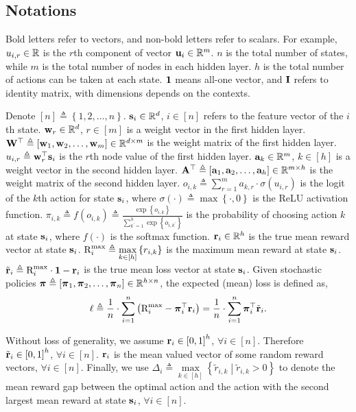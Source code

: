 \subsection{Notations}
\label{subsec:notations}

Bold letters refer to vectors, and non-bold letters refer to scalars. For example, $u_{i,r} \in {\mathbb{R}}$ is the $r$th component of vector ${\mathbf{u}}_i \in {\mathbb{R}}^m$. $n$ is the total number of states, while $m$ is the total number of nodes in each hidden layer. $h$ is the total number of actions can be taken at each state. ${\mathbf{1}}$ means all-one vector, and ${\mathbf{I}}$ refers to identity matrix, with dimensions depends on the contexts.

Denote $[n] \triangleq \left\{ 1,2, \dots, n \right\}$. ${\mathbf{s}}_i \in {\mathbb{R}}^d$, $i \in [n]$ refers to the feature vector of the $i$th state. ${\mathbf{w}}_r \in {\mathbb{R}}^d$, $r \in [m]$ is a weight vector in the first hidden layer. ${\mathbf{W}}^\top \triangleq \left[ {\mathbf{w}}_1, {\mathbf{w}}_2, \dots, {\mathbf{w}}_m \right] \in {\mathbb{R}}^{d \times m}$ is the weight matrix of the first hidden layer. $u_{i,r} \triangleq {\mathbf{w}}_r^\top {\mathbf{s}}_i$ is the $r$th node value of the first hidden layer. ${\mathbf{a}}_k \in {\mathbb{R}}^m$, $k \in [h]$ is a weight vector in the second hidden layer. ${\mathbf{A}}^\top \triangleq \left[ {\mathbf{a}}_1, {\mathbf{a}}_2, \dots, {\mathbf{a}}_h \right] \in {\mathbb{R}}^{m \times h}$ is the weight matrix of the second hidden layer. $o_{i,k} \triangleq \sum\limits_{r=1}^{m}{a_{k,r} \cdot \sigma\left( u_{i,r} \right)}$ is the logit of the $k$th action for state ${\mathbf{s}}_i$, where $\sigma(\cdot) \triangleq \max\left\{ \cdot, 0 \right\}$ is the ReLU activation function. $\pi_{i,k} \triangleq f\left( o_{i,k} \right) \triangleq \frac{\exp\left\{ o_{i,k} \right\}}{\sum\limits_{k^\prime = 1}^{h}{\exp\left\{ o_{i,k^\prime} \right\}}}$ is the probability of choosing action $k$ at state ${\mathbf{s}}_i$, where $f(\cdot)$ is the softmax function. ${\mathbf{r}}_i \in {\mathbb{R}}^h$ is the true mean reward vector at state ${\mathbf{s}}_i$. ${\text{R}}_i^{\max} \triangleq \max\limits_{k \in [h]}\left\{ r_{i,k} \right\}$ is the maximum mean reward at state ${\mathbf{s}}_i$. ${\tilde{\mathbf{r}}}_i \triangleq {\text{R}}_i^{\max} \cdot {\mathbf{1}} - {\mathbf{r}}_i$ is the true mean loss vector at state ${\mathbf{s}}_i$. Given stochastic policies ${\boldsymbol{\pi}} \triangleq \left[ {\boldsymbol{\pi}}_1, {\boldsymbol{\pi}}_2, \dots, {\boldsymbol{\pi}}_n \right] \in {\mathbb{R}}^{h \times n}$, the expected (mean) loss is defined as,
\begin{equation}
\label{eq:expected_loss}
\begin{split}
    \ell \triangleq \frac{1}{n} \cdot \sum\limits_{i=1}^{n}{ \left( {\text{R}}_i^{\max} - {\boldsymbol{\pi}}_i^\top {\mathbf{r}}_i \right) } = \frac{1}{n} \cdot \sum\limits_{i=1}^{n}{ {\boldsymbol{\pi}}_{i}^\top {\tilde{\mathbf{r}}}_{i} }.
\end{split}
\end{equation}

Without loss of generality, we assume ${\mathbf{r}}_i \in \left[ 0, 1 \right]^h$, $\forall i \in [n]$. Therefore ${\tilde{\mathbf{r}}}_i \in \left[ 0, 1 \right]^h$, $\forall i \in [n]$. ${\mathbf{r}}_i$ is the mean valued vector of some random reward vectors,  $\forall i \in [n]$. Finally, we use $\Delta_i \triangleq \max\limits_{k \in [h]}\left\{ \tilde{r}_{i,k} \middle| \tilde{r}_{i,k} > 0 \right\}$ to denote the mean reward gap between the optimal action and the action with the second largest mean reward at state ${\mathbf{s}}_i$, $\forall i \in [n]$.